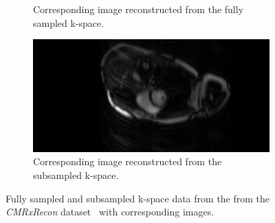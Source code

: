 \documentclass[english,version-2022-01]{uzl-thesis} %
\begin{document}
\begin{figure}[h]
\begin{subfigure}{0.45\textwidth}
    		\caption{Corresponding image reconstructed from the fully sampled k-space.}
    		\label{fig:fullySampledImage}
	\end{subfigure}
	\hfill
	\begin{subfigure}{0.45\textwidth}
    		\includegraphics[width=\textwidth]{image_subsampled.png}
    		\caption{Corresponding image reconstructed from the subsampled k-space.}
    		\label{fig:subSampledImage}
	\end{subfigure}
	\caption{Fully sampled and subsampled k-space data from the from the \emph{CMRxRecon} dataset~\cite{CMRxRecon} with corresponding images.}
	\label{fig:k-space}
\end{figure}




\end{document}
